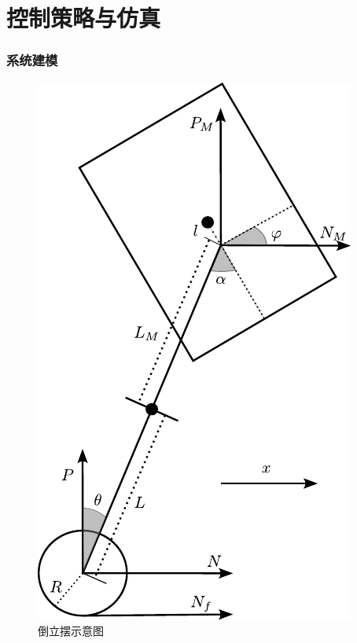 \documentclass{beamer}
\begin{document}
	\section[控制策略与仿真]{控制策略与仿真}
	\begin{frame}
		\frametitle{系统建模}
		\begin{figure}         
			\includegraphics[width=0.33\linewidth]{img/chapter3/1.pdf}  
			\captionsetup{font=scriptsize} 
			\caption{倒立摆示意图} 
			
		\end{figure}  
	\end{frame}
	
\end{document}
